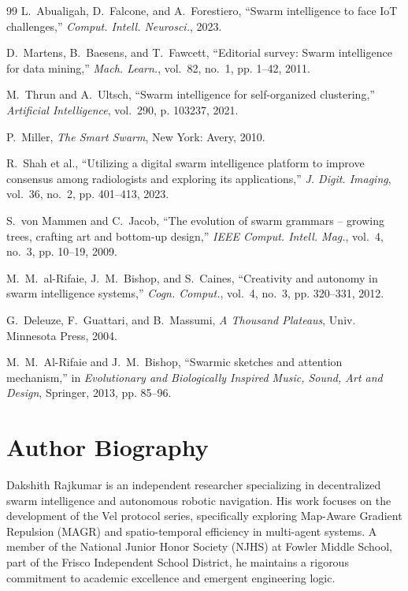 \documentclass[letterpaper, 10pt, conference]{IEEEtran}
\begin{document}
\begin{thebibliography}{99}
L.~Abualigah, D.~Falcone, and A.~Forestiero, ``Swarm intelligence to face {IoT} challenges,'' \emph{Comput. Intell. Neurosci.}, 2023.

D.~Martens, B.~Baesens, and T.~Fawcett, ``Editorial survey: Swarm intelligence for data mining,'' \emph{Mach. Learn.}, vol.~82, no.~1, pp. 1--42, 2011.

M.~Thrun and A.~Ultsch, ``Swarm intelligence for self-organized clustering,'' \emph{Artificial Intelligence}, vol.~290, p. 103237, 2021.

P.~Miller, \emph{The Smart Swarm}, New York: Avery, 2010.

R.~Shah et al., ``Utilizing a digital swarm intelligence platform to improve consensus among radiologists and exploring its applications,'' \emph{J. Digit. Imaging}, vol.~36, no.~2, pp. 401--413, 2023.

S.~von Mammen and C.~Jacob, ``The evolution of swarm grammars -- growing trees, crafting art and bottom-up design,'' \emph{IEEE Comput. Intell. Mag.}, vol.~4, no.~3, pp. 10--19, 2009.

M.~M.~al-Rifaie, J.~M.~Bishop, and S.~Caines, ``Creativity and autonomy in swarm intelligence systems,'' \emph{Cogn. Comput.}, vol.~4, no.~3, pp. 320--331, 2012.

G.~Deleuze, F.~Guattari, and B.~Massumi, \emph{A Thousand Plateaus}, Univ. Minnesota Press, 2004.

M.~M.~Al-Rifaie and J.~M.~Bishop, ``Swarmic sketches and attention mechanism,'' in \emph{Evolutionary and Biologically Inspired Music, Sound, Art and Design}, Springer, 2013, pp. 85--96.

\end{thebibliography}

\section*{Author Biography}
\vspace{-7ex} 

\begin{IEEEbiographynophoto}{Dakshith Rajkumar}
is an independent researcher specializing in decentralized swarm intelligence and autonomous robotic navigation. His work focuses on the development of the Vel protocol series, specifically exploring Map-Aware Gradient Repulsion (MAGR) and spatio-temporal efficiency in multi-agent systems. A member of the National Junior Honor Society (NJHS) at Fowler Middle School, part of the Frisco Independent School District, he maintains a rigorous commitment to academic excellence and emergent engineering logic.
\end{IEEEbiographynophoto}

\vfill %
\end{document}

